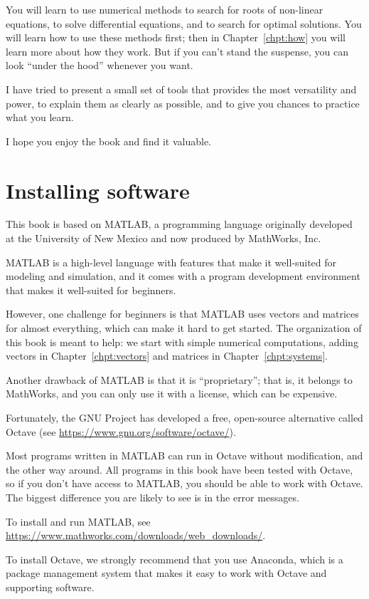 \documentclass[main.tex]{subfiles}
\begin{document}
You will learn to use numerical methods to search for roots of non-linear equations, to solve differential equations, and to search for optimal solutions.  You will learn how to use these methods first; then in Chapter~\ref{chpt:how} you will learn more about how they work.  But if you can't stand the suspense, you can look ``under the hood'' whenever you want.

I have tried to present a small set of tools that provides the most versatility and power, to explain them as clearly as possible, and to give you chances to practice what you learn.

I hope you enjoy the book and find it valuable.


\section*{Installing software}

This book is based on MATLAB, a programming language originally developed at the University of New Mexico and now produced by MathWorks, Inc.  

MATLAB is a high-level language with features that make it well-suited for modeling and simulation, and it comes with a program development environment that makes it well-suited for beginners.

However, one challenge for beginners is that MATLAB uses vectors and matrices for almost everything, which can make it hard to get started.  The organization of this book is meant to help: we start with simple numerical computations, adding vectors in Chapter~\ref{chpt:vectors} and matrices in Chapter~\ref{chpt:systems}.

Another drawback of MATLAB is that it is ``proprietary''; that is, it belongs to MathWorks, and you can only use it with a license, which can be expensive.

Fortunately, the GNU Project has developed a free, open-source alternative called Octave (see \url{https://www.gnu.org/software/octave/}).  

Most programs written in MATLAB can run in Octave without modification, and the other way around.  All programs in this book have been tested with Octave, so if you don't have access to MATLAB, you should be able to work with Octave.  The biggest difference you are likely to see is in the error messages.

To install and run MATLAB, see \url{https://www.mathworks.com/downloads/web_downloads/}.

To install Octave, we strongly recommend that you use Anaconda, which is a package management system that makes it easy to work with Octave and supporting software.
\end{document}
